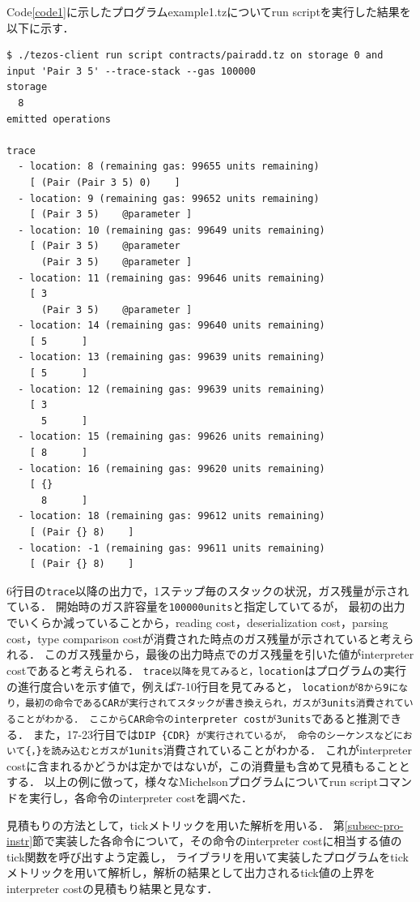 \documentclass{kuisthesis}
\begin{document}
Code\ref{code1}に示したプログラムexample1.tzについてrun scriptを実行した結果を以下に示す．

\begin{lstlisting}[basicstyle={\ttfamily\color{base}\scriptsize}]
$ ./tezos-client run script contracts/pairadd.tz on storage 0 and input 'Pair 3 5' --trace-stack --gas 100000
storage
  8
emitted operations
  
trace
  - location: 8 (remaining gas: 99655 units remaining)
    [ (Pair (Pair 3 5) 0)  	 ]
  - location: 9 (remaining gas: 99652 units remaining)
    [ (Pair 3 5)  	@parameter ]
  - location: 10 (remaining gas: 99649 units remaining)
    [ (Pair 3 5)  	@parameter
      (Pair 3 5)  	@parameter ]
  - location: 11 (remaining gas: 99646 units remaining)
    [ 3  	
      (Pair 3 5)  	@parameter ]
  - location: 14 (remaining gas: 99640 units remaining)
    [ 5  	 ]
  - location: 13 (remaining gas: 99639 units remaining)
    [ 5  	 ]
  - location: 12 (remaining gas: 99639 units remaining)
    [ 3  	
      5  	 ]
  - location: 15 (remaining gas: 99626 units remaining)
    [ 8  	 ]
  - location: 16 (remaining gas: 99620 units remaining)
    [ {}  	
      8  	 ]
  - location: 18 (remaining gas: 99612 units remaining)
    [ (Pair {} 8)  	 ]
  - location: -1 (remaining gas: 99611 units remaining)
    [ (Pair {} 8)  	 ]
\end{lstlisting}

6行目の{\tt trace}以降の出力で，1ステップ毎のスタックの状況，ガス残量が示されている．
開始時のガス許容量を{\tt 100000units}と指定していてるが，
最初の出力でいくらか減っていることから，reading cost，deserialization cost，parsing cost，type comparison costが消費された時点のガス残量が示されていると考えられる．
このガス残量から，最後の出力時点でのガス残量を引いた値がinterpreter costであると考えられる．
{\tt trace以降を見てみると，location}はプログラムの実行の進行度合いを示す値で，例えば7-10行目を見てみると，
{\tt locationが8から9になり，最初の命令であるCARが実行されてスタックが書き換えられ，ガスが3units消費されていることがわかる．
ここからCAR命令のinterpreter costが3units}であると推測できる．
また，17-23行目では{\tt DIP \{CDR\} が実行されているが，
命令のシーケンスなどにおいて\{，\}を読み込むとガスが1units}消費されていることがわかる．
これがinterpreter costに含まれるかどうかは定かではないが，この消費量も含めて見積もることとする．
以上の例に倣って，様々なMichelsonプログラムについてrun scriptコマンドを実行し，各命令のinterpreter costを調べた．

見積もりの方法として，tickメトリックを用いた解析を用いる．
第\ref{subsec-pro-instr}節で実装した各命令について，その命令のinterpreter costに相当する値のtick関数を呼び出すよう定義し，
ライブラリを用いて実装したプログラムをtickメトリックを用いて解析し，解析の結果として出力されるtick値の上界をinterpreter costの見積もり結果と見なす．
\end{document}
